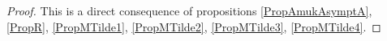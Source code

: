 \documentclass{jams-l}
\theoremstyle{definition}
\theoremstyle{remark}
\numberwithin{equation}{section}
\begin{document}
            \begin{proof}
            
                This is a direct consequence of propositions \ref{PropAmukAsymptA}, \ref{PropR}, \ref{PropMTilde1}, \ref{PropMTilde2}, \ref{PropMTilde3}, \ref{PropMTilde4}.
            
            \end{proof}
\end{document}
